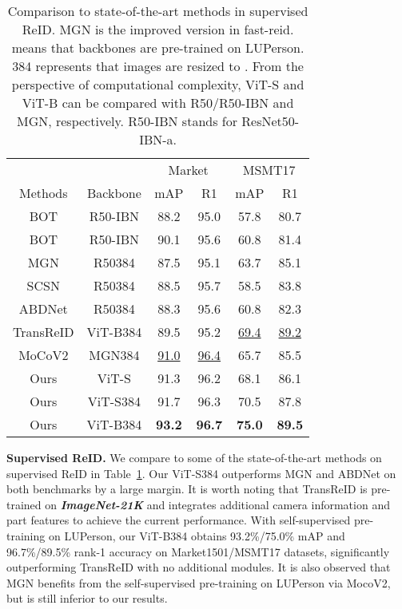 \documentclass[10pt,twocolumn,letterpaper]{article}
\begin{document}
\begin{table}[tb]\small
    \begin{center}
\begin{tabular}{c@{\hspace{1pt}}c|cc|cc}
    \hline
     &  & \multicolumn{2}{c|}{Market}  & \multicolumn{2}{c}{MSMT17}\\
    Methods &Backbone & mAP & R1 & mAP & R1\\
    \hline
    BOT \cite{luo2019strong} & R50-IBN & 88.2 & 95.0 & 57.8 & 80.7 \\
    BOT \cite{luo2019strong} & R50-IBN & 90.1 & 95.6 & 60.8 & 81.4  \\
    MGN \cite{MGN} & R50384 &87.5 &95.1 &63.7 &85.1 \\
    SCSN \cite{SCSN} & R50384 &88.5 &95.7 &58.5 &83.8 \\
    ABDNet \cite{ABD-Net} & R50384 &88.3 &95.6 &60.8 &82.3\\
    TransReID\cite{he2021transreid} & ViT-B384 &89.5 &95.2 &\underline{69.4} &\underline{89.2} \\
    MoCoV2 \cite{fu2021unsupervised} & MGN384 & \underline{91.0} & \underline{96.4} & 65.7 & 85.5 \\
    \hline
    Ours & ViT-S&91.3 &96.2 &68.1&86.1 \\
    Ours & ViT-S384 &91.7 &96.3 &70.5 &87.8 \\
    Ours & ViT-B384 &\textbf{93.2 }&\textbf{96.7} &\textbf{75.0} &\textbf{89.5}\\
    \hline
    \end{tabular}
    \end{center}
    \vspace{-1em}
    \caption{\label{tab:sota1}Comparison to state-of-the-art methods in supervised ReID. MGN is the improved version in fast-reid.  means that backbones are pre-trained on LUPerson. 384 represents that images are resized to . From the perspective of computational complexity, ViT-S and ViT-B can be compared with R50/R50-IBN and MGN, respectively. R50-IBN stands for ResNet50-IBN-a.}
\end{table}

\textbf{Supervised ReID.} We compare to some of the state-of-the-art methods on supervised ReID in Table~\ref{tab:sota1}. Our ViT-S384 outperforms MGN and ABDNet on both benchmarks by a large margin. It is worth noting that TransReID is pre-trained on \textbf{\textit{ ImageNet-21K}} and integrates additional camera information and part features to achieve the current performance. With self-supervised pre-training on LUPerson, our ViT-B384 obtains 93.2\%/75.0\% mAP and 96.7\%/89.5\% rank-1 accuracy on Market1501/MSMT17 datasets, significantly outperforming TransReID with no additional modules. It is also  observed that MGN benefits from the self-supervised pre-training on LUPerson via MocoV2, but is still inferior to our results.
\end{document}

